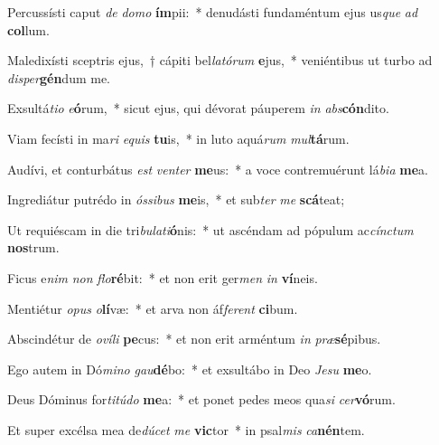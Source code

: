 \item Percussísti caput \textit{de} \textit{do}\textit{mo} \textbf{ím}pii:~* denudásti fundaméntum ejus us\textit{que} \textit{ad} \textbf{col}lum.
\item Maledixísti sceptris ejus,~† cápiti bel\textit{la}\textit{tó}\textit{rum} \textbf{e}jus,~* veniéntibus ut turbo ad \textit{di}\textit{sper}\textbf{gén}dum me.
\item Exsultá\textit{ti}\textit{o} \textit{e}\textbf{ó}rum,~* sicut ejus, qui dévorat páuperem \textit{in} \textit{abs}\textbf{cón}dito.
\item Viam fecísti in ma\textit{ri} \textit{e}\textit{quis} \textbf{tu}is,~* in luto aquá\textit{rum} \textit{mul}\textbf{tá}rum.
\item Audívi, et conturbátus \textit{est} \textit{ven}\textit{ter} \textbf{me}us:~* a voce contremuérunt lá\textit{bi}\textit{a} \textbf{me}a.
\item Ingrediátur putrédo in \textit{ós}\textit{si}\textit{bus} \textbf{me}is,~* et sub\textit{ter} \textit{me} \textbf{scá}teat;
\item Ut requiéscam in die tri\textit{bu}\textit{la}\textit{ti}\textbf{ó}nis:~* ut ascéndam ad pópulum ac\textit{cínc}\textit{tum} \textbf{nos}trum.
\item Ficus e\textit{nim} \textit{non} \textit{flo}\textbf{ré}bit:~* et non erit ger\textit{men} \textit{in} \textbf{ví}neis.
\item Mentiétur \textit{o}\textit{pus} \textit{o}\textbf{lí}væ:~* et arva non áf\textit{fe}\textit{rent} \textbf{ci}bum.
\item Abscindétur de \textit{o}\textit{ví}\textit{li} \textbf{pe}cus:~* et non erit arméntum \textit{in} \textit{præ}\textbf{sé}pibus.
\item Ego autem in Dó\textit{mi}\textit{no} \textit{gau}\textbf{dé}bo:~* et exsultábo in Deo \textit{Je}\textit{su} \textbf{me}o.
\item Deus Dóminus for\textit{ti}\textit{tú}\textit{do} \textbf{me}a:~* et ponet pedes meos qua\textit{si} \textit{cer}\textbf{vó}rum.
\item Et super excélsa mea de\textit{dú}\textit{cet} \textit{me} \textbf{vic}tor~* in psal\textit{mis} \textit{ca}\textbf{nén}tem.
